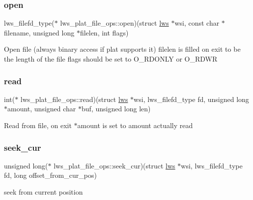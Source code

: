 \subsubsection{\texorpdfstring{open}{open}}
{\footnotesize\ttfamily lws\+\_\+filefd\+\_\+type($\ast$ lws\+\_\+plat\+\_\+file\+\_\+ops\+::open)(struct \hyperlink{structlws}{lws} $\ast$wsi, const char $\ast$filename, unsigned long $\ast$filelen, int flags)}

Open file (always binary access if plat supports it) filelen is filled on exit to be the length of the file flags should be set to O\+\_\+\+R\+D\+O\+N\+LY or O\+\_\+\+R\+D\+WR \mbox{\label{structlws__plat__file__ops_ae7d4c66f479bb978213197301878d335}} 
\subsubsection{\texorpdfstring{read}{read}}
{\footnotesize\ttfamily int($\ast$ lws\+\_\+plat\+\_\+file\+\_\+ops\+::read)(struct \hyperlink{structlws}{lws} $\ast$wsi, lws\+\_\+filefd\+\_\+type fd, unsigned long $\ast$amount, unsigned char $\ast$buf, unsigned long len)}

Read from file, on exit $\ast$amount is set to amount actually read \mbox{\label{structlws__plat__file__ops_a4674d930d95dfaeb13793aba133ada07}} 
\subsubsection{\texorpdfstring{seek\+\_\+cur}{seek\_cur}}
{\footnotesize\ttfamily unsigned long($\ast$ lws\+\_\+plat\+\_\+file\+\_\+ops\+::seek\+\_\+cur)(struct \hyperlink{structlws}{lws} $\ast$wsi, lws\+\_\+filefd\+\_\+type fd, long offset\+\_\+from\+\_\+cur\+\_\+pos)}

seek from current position \mbox{\label{structlws__plat__file__ops_a22186d061e99baee5a17fb41417a0e5e}} 
